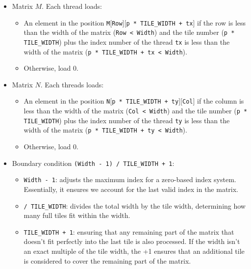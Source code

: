 \begin{itemize}
    \item Matrix $M$. Each thread loads:
    \begin{itemize}
        \item An element in the position \texttt{M}[\texttt{Row}][\texttt{p * TILE\_WIDTH + tx}] if the row is less than the width of the matrix (\texttt{Row < Width}) and the tile number (\texttt{p * TILE\_WIDTH}) plus the index number of the thread \texttt{tx} is less than the width of the matrix (\texttt{p * TILE\_WIDTH + tx < Width}).
        \item Otherwise, load 0.
    \end{itemize}

    \item Matrix $N$. Each threads loads:
    \begin{itemize}
        \item An element in the position \texttt{N}[\texttt{p * TILE\_WIDTH + ty}][\texttt{Col}] if the column is less than the width of the matrix (\texttt{Col < Width}) and the tile number (\texttt{p * TILE\_WIDTH}) plus the index number of the thread \texttt{ty} is less than the width of the matrix (\texttt{p * TILE\_WIDTH + ty < Width}).
        \item Otherwise, load 0.
    \end{itemize}

    \item Boundary condition \texttt{(Width - 1) / TILE\_WIDTH + 1}:
    \begin{itemize}
        \item \texttt{Width - 1}: adjusts the maximum index for a zero-based index system. Essentially, it ensures we account for the last valid index in the matrix.

        \item \texttt{/ TILE\_WIDTH}: divides the total width by the tile width, determining how many full tiles fit within the width.

        \item \texttt{TILE\_WIDTH + 1}: ensuring that any remaining part of the matrix that doesn't fit perfectly into the last tile is also processed. If the width isn't an exact multiple of the tile width, the +1 ensures that an additional tile is considered to cover the remaining part of the matrix.
    \end{itemize}
\end{itemize}
